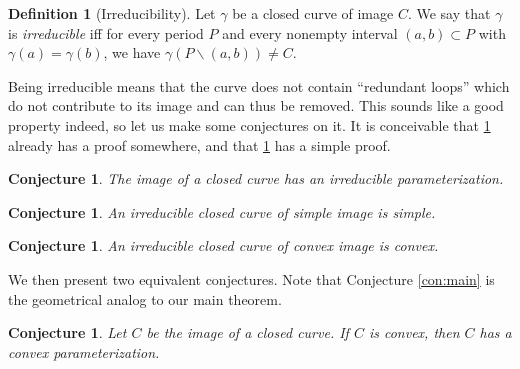 \documentclass{amsart}
\newtheorem{conjecture}[proposition]{Conjecture}
\theoremstyle{definition}
\newtheorem{definition}[proposition]{Definition}
\theoremstyle{remark}
\begin{document}
\begin{definition}[Irreducibility]
    Let $\gamma$ be a closed curve of image $C$.
    We say that $\gamma$ is \emph{irreducible} iff for every period
    $P$ and every nonempty interval $(a,b)\subset P$
    with $\gamma(a)=\gamma(b)$, we have
    $\gamma(P\backslash(a,b))\ne C$.
\end{definition}

Being irreducible means that the curve does not contain
``redundant loops'' which do not contribute to its image
and can thus be removed.
This sounds like a good property indeed,
so let us make some conjectures on it.
It is conceivable that
\ref{con:irr_exists} already has a proof somewhere,
and that \ref{con:irr_simple} has a simple proof.

\begin{conjecture}
    \label{con:irr_exists}
    The image of a closed curve has an irreducible parameterization.
\end{conjecture}

\begin{conjecture}
    \label{con:irr_simple}
    An irreducible closed curve of simple image is simple.
\end{conjecture}

\begin{conjecture}
    \label{con:irr_convex}
    An irreducible closed curve of convex image is convex.
\end{conjecture}


We then present two equivalent conjectures.
Note that Conjecture \ref{con:main} is the geometrical analog to
our main theorem.

\begin{conjecture}
    \label{con:convex}
    Let $C$ be the image of a closed curve. If $C$ is convex,
    then $C$ has a convex parameterization.
\end{conjecture}
\end{document}
